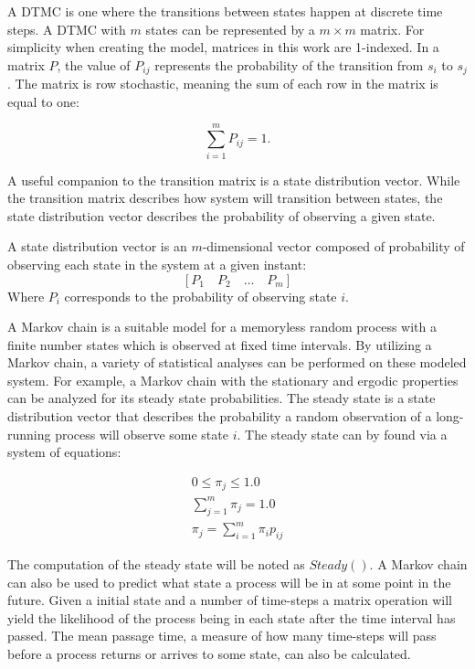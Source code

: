 A \ac{DTMC} is one where the transitions between states happen at discrete time steps.
A \ac{DTMC} with $m$ states can be represented by a $m\times m$ matrix.
For simplicity when creating the model, matrices in this work are 1-indexed.
In a matrix $P$, the value of $P_{ij}$ represents the probability of the transition from $s_i$ to $s_j$.
The matrix is row stochastic, meaning the sum of each row in the matrix is equal to one:

\begin{equation} \sum_{i=1}^{m} P_{ij} = 1. \end{equation}

A useful companion to the transition matrix is a state distribution vector.
While the transition matrix describes how system will transition between states, the state distribution vector describes the probability of observing a given state.

\begin{pdef}
A state distribution vector is an $m$-dimensional vector composed of probability of observing each state in the system at a given instant:
\[ [P_{1} \quad P_{2} \quad \ldots \quad P_{m} ] \]
Where $P_{i}$ corresponds to the probability of observing state $i$.
\end{pdef}

A Markov chain is a suitable model for a memoryless random process with a finite number states which is observed at fixed time intervals.
By utilizing a Markov chain, a variety of statistical analyses can be performed on these modeled system.
For example, a Markov chain with the stationary and ergodic properties can be analyzed for its steady state probabilities.
The steady state is a state distribution vector that describes the probability a random observation of a long-running process will observe some state $i$.
The steady state can by found via a system of equations: \cite{MARKOV3}

\begin{align}
0\leq\pi_j\leq1.0 \\
\sum_{j = 1}^{m}\pi_j = 1.0 \\
\pi_j = \sum_{i=1}^{m} \pi_i p_{ij}
\end{align}

The computation of the steady state will be noted as $Steady()$.
A Markov chain can also be used to predict what state a process will be in at some point in the future.
Given a initial state and a number of time-steps a matrix operation will yield the likelihood of the process being in each state after the time interval has passed.
The mean passage time, a measure of how many time-steps will pass before a process returns or arrives to some state, can also be calculated.

